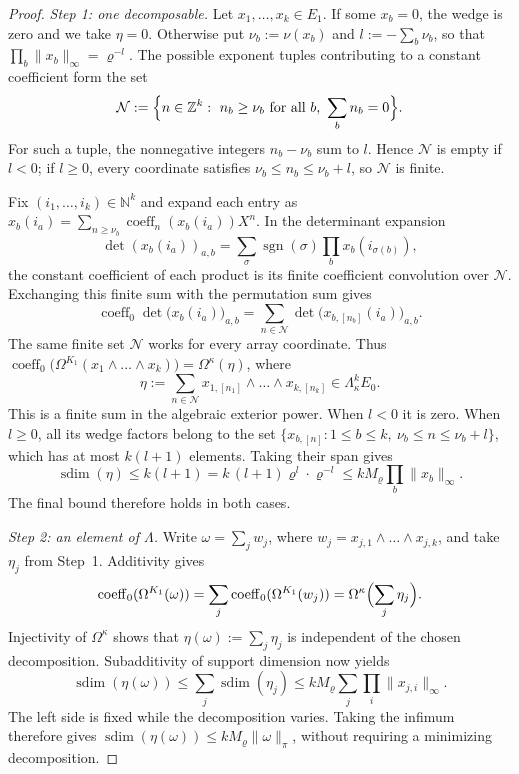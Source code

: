 \documentclass[11pt]{amsart}
\theoremstyle{definition}
\theoremstyle{remark}
\numberwithin{equation}{section}
\newcommand{\N}{\mathbb N}
\newcommand{\Z}{\mathbb Z}
\newcommand{\sgn}{\operatorname{sgn}}
\newcommand{\norm}[1]{\lVert #1\rVert}
\newcommand{\coeff}{\operatorname{coeff}}
\newcommand{\sdim}{\operatorname{sdim}}
\theoremstyle{plain}
\theoremstyle{definition}
\theoremstyle{plain}
\begin{document}
\begin{proof}
\emph{Step 1: one decomposable.} Let $x_1,\dots,x_k\in E_1$. If some $x_b=0$, the wedge is zero and we take $\eta=0$.
Otherwise put $\nu_b:=\nu(x_b)$ and $l:=-\sum_b\nu_b$, so that
$\prod_b\norm{x_b}_\infty=\varrho^{-l}$. The possible exponent tuples contributing to a constant coefficient form the set
\[
\mathcal N:=\Bigl\{n\in\Z^k:\ n_b\ge\nu_b\text{ for all }b,\ \sum_bn_b=0\Bigr\}.
\]
For such a tuple, the nonnegative integers $n_b-\nu_b$ sum to $l$. Hence $\mathcal N$ is empty if $l<0$;
if $l\ge0$, every coordinate satisfies $\nu_b\le n_b\le\nu_b+l$, so $\mathcal N$ is finite.

Fix $(i_1,\dots,i_k)\in\N^k$ and expand each entry as
$x_b(i_a)=\sum_{n\ge\nu_b}\coeff_n(x_b(i_a))X^n$. In the determinant expansion
\[
\det(x_b(i_a))_{a,b}=\sum_\sigma\sgn(\sigma)\prod_bx_b(i_{\sigma(b)}),
\]
the constant coefficient of each product is its finite coefficient convolution over $\mathcal N$.
Exchanging this finite sum with the permutation sum gives
\[
\coeff_0\det\bigl(x_b(i_a)\bigr)_{a,b}
=\sum_{n\in\mathcal N}\det\bigl(x_{b,[n_b]}(i_a)\bigr)_{a,b}.
\]
The same finite set $\mathcal N$ works for every array coordinate. Thus
$\coeff_0\bigl(\Omega^{K_1}(x_1\wedge\dots\wedge x_k)\bigr)=\Omega^\kappa(\eta)$, where
\[
\eta:=\sum_{n\in\mathcal N}x_{1,[n_1]}\wedge\dots\wedge x_{k,[n_k]}\in\Lambda^k_\kappa E_0.
\]
This is a finite sum in the algebraic exterior power. When $l<0$ it is zero. When $l\ge0$, all its wedge factors
belong to the set
$\{x_{b,[n]}:1\le b\le k,\ \nu_b\le n\le\nu_b+l\}$, which has at most $k(l+1)$ elements. Taking their span gives
\[
\sdim(\eta)\le k(l+1)=k\,(l+1)\varrho^l\cdot \varrho^{-l}\le kM_\varrho\prod_b\norm{x_b}_\infty.
\]
The final bound therefore holds in both cases.

\emph{Step 2: an element of $\Lambda$.} Write $\omega=\sum_jw_j$, where
$w_j=x_{j,1}\wedge\dots\wedge x_{j,k}$, and take $\eta_j$ from Step~1. Additivity gives
\[
\coeff_0(\Omega^{K_1}(\omega))
=\sum_j\coeff_0(\Omega^{K_1}(w_j))
=\Omega^\kappa\Bigl(\sum_j\eta_j\Bigr).
\]
Injectivity of $\Omega^\kappa$ shows that $\eta(\omega):=\sum_j\eta_j$ is independent of the chosen decomposition.
Subadditivity of support dimension now yields
\[
\sdim(\eta(\omega))\le\sum_j\sdim(\eta_j)
\le kM_\varrho\sum_j\prod_i\norm{x_{j,i}}_\infty.
\]
The left side is fixed while the decomposition varies. Taking the infimum therefore gives
$\sdim(\eta(\omega))\le kM_\varrho\norm\omega_\pi$, without requiring a minimizing decomposition.


\end{proof}
\end{document}
